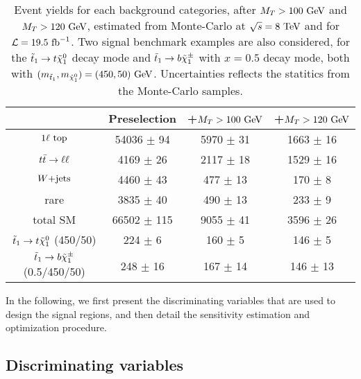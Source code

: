     \begin{table}[h!]
        \centering
        \begin{tabular}{|c|ccc|}
            \hline
                          & Preselection       & +$M_T > 100 ~\text{GeV}$   & +$M_T > 120 ~\text{GeV}$     \\
            \hline
        $1\ell~\text{top}$   & 54036 $\pm$ 94     &  5970 $\pm$ 31      &  1663 $\pm$ 16       \\
        $t\bar{t} \rightarrow \ell \ell$    &  4169 $\pm$ 26     &  2117 $\pm$ 18      &  1529 $\pm$ 16       \\
        $\text{$W$+jets}$          &  4460 $\pm$ 43     &   477 $\pm$ 13      &   170 $\pm$ 8        \\
        rare              &  3835 $\pm$ 40     &   490 $\pm$ 13      &   233 $\pm$ 9        \\
            \hline
        total SM          & 66502 $\pm$ 115    &  9055 $\pm$ 41      &  3596 $\pm$ 26       \\
            \hline
$\tilde{t}_1 \rightarrow t \tilde{\chi}_1^0$   (450/50) & 224 $\pm$ 6         & 160 $\pm$ 5   & 146 $\pm$ 5   \\
$\tilde{t}_1 \rightarrow b \tilde{\chi}_1^\pm$ (0.5/450/50) & 248 $\pm$ 16        & 167 $\pm$ 14  & 146 $\pm$ 13  \\
            \hline
        \end{tabular}
        \caption{Event yields for each background categories, after $M_T > 100
        ~\text{GeV}$ and $M_T > 120 ~\text{GeV}$, estimated from Monte-Carlo at $\sqrt{s} = 8~\text{TeV}$
        and for $\mathcal{L} = 19.5~\text{fb}^{-1}$. Two signal benchmark examples are also
        considered, for the $\tilde{t}_1 \rightarrow t \tilde{\chi}_1^0$ decay mode and $\tilde{t}_1
        \rightarrow b \tilde{\chi}_1^\pm$ with $x = 0.5$ decay mode, both with $(m_{\tilde{t}_1},m_{\tilde{\chi}_1^0})
        = (450,50)~\text{GeV}$. Uncertainties reflects the statitics from the Monte-Carlo samples.}
        \label{tab:MTcutImpact}
    \end{table}

    In the following, we first present the discriminating variables that are
    used to design the signal regions, and then detail the sensitivity
    estimation and optimization procedure.

    \subsection{Discriminating variables \label{sec:analysis_variables}}

